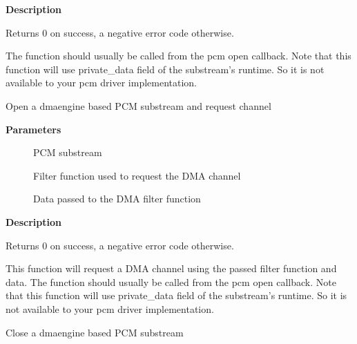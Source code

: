 \documentclass[a4paper,8pt,english]{sphinxmanual}
\begin{document}
\textbf{Description}

Returns 0 on success, a negative error code otherwise.

The function should usually be called from the pcm open callback. Note that
this function will use private\_data field of the substream's runtime. So it
is not available to your pcm driver implementation.

\begin{fulllineitems}
\label{sound/kernel-api/alsa-driver-api:c.snd_dmaengine_pcm_open_request_chan}
Open a dmaengine based PCM substream and request channel

\end{fulllineitems}


\textbf{Parameters}
\begin{description}
\item[{}] \leavevmode
PCM substream

\item[{}] \leavevmode
Filter function used to request the DMA channel

\item[{}] \leavevmode
Data passed to the DMA filter function

\end{description}

\textbf{Description}

Returns 0 on success, a negative error code otherwise.

This function will request a DMA channel using the passed filter function and
data. The function should usually be called from the pcm open callback. Note
that this function will use private\_data field of the substream's runtime. So
it is not available to your pcm driver implementation.

\begin{fulllineitems}
\label{sound/kernel-api/alsa-driver-api:c.snd_dmaengine_pcm_close}
Close a dmaengine based PCM substream

\end{fulllineitems}
\end{document}
